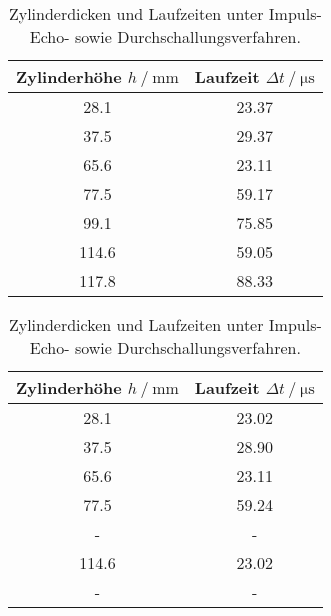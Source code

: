 \begin{table}[H]
    \begin{subtable}{0.5\textwidth}
        \centering
        \caption{Laufzeitbestimmung über Impuls-Echo-Verfahren.}
        \label{tab:1a}  
        \begin{tabular}{c c}
        \toprule 
        {Zylinderhöhe $h \mathbin{/} \unit{\milli\meter}$} & {Laufzeit $\Delta t \mathbin{/} \unit{\micro\second}$} \\
        \midrule 
         28.1      &       23.37       \\ 
         37.5      &       29.37       \\  
         65.6      &       23.11       \\
         77.5      &       59.17       \\ 
         99.1      &       75.85       \\ 
        114.6      &       59.05       \\
        117.8      &       88.33       \\  
        \bottomrule
        \end{tabular}   
    \end{subtable}
    \begin{subtable}{0.5\textwidth}
        \centering
        \caption{Laufzeitbestimmung über Durchschallungsverfahren.}
        \label{tab:1b} 
        \begin{tabular}{c c}
        \toprule 
        {Zylinderhöhe $h \mathbin{/} \unit{\milli\meter}$} & {Laufzeit $\Delta t \mathbin{/} \unit{\micro\second}$} \\
        \midrule 
         28.1       &       23.02       \\   
         37.5       &       28.90       \\
         65.6       &       23.11       \\   
         77.5       &       59.24       \\
         -          &       -           \\      
        114.6       &       23.02       \\ 
         -          &       -           \\
        \bottomrule
        \end{tabular}  
    \end{subtable}
 \caption{Zylinderdicken und Laufzeiten unter Impuls-Echo- sowie Durchschallungsverfahren.} 
\end{table}

